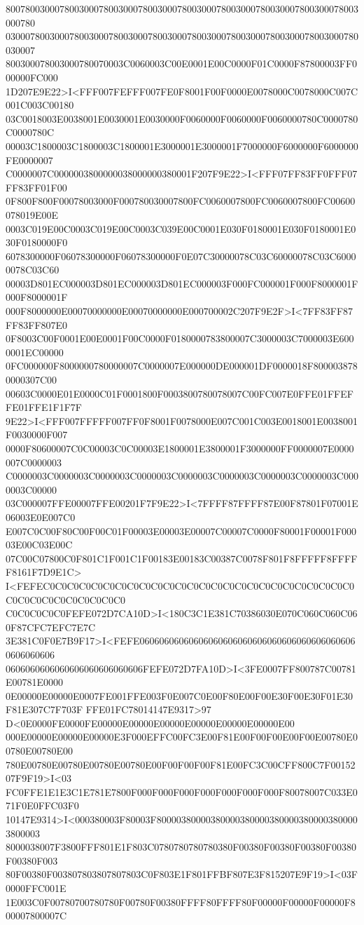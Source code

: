 800780030007800300078003000780030007800300078003000780030007800300078003000780
030007800300078003000780030007800300078003000780030007800300078003000780030007
800300078003000780070003C0060003C00E0001E00C0000F01C0000F87800003FF000000FC000
1D207E9E22>I<FFF007FEFFF007FE0F8001F00F0000E0078000C0078000C007C001C003C00180
03C0018003E0038001E0030001E0030000F0060000F0060000F0060000780C0000780C0000780C
00003C1800003C1800003C1800001E3000001E3000001F7000000F6000000F6000000FE0000007
C0000007C0000003800000038000000380001F207F9E22>I<FFF07FF83FF0FFF07FF83FF01F00
0F800F800F00078003000F000780030007800FC0060007800FC0060007800FC00600078019E00E
0003C019E00C0003C019E00C0003C039E00C0001E030F0180001E030F0180001E030F0180000F0
6078300000F06078300000F06078300000F0E07C30000078C03C60000078C03C60000078C03C60
00003D801EC000003D801EC000003D801EC000003F000FC000001F000F8000001F000F8000001F
000F8000000E00070000000E00070000000E000700002C207F9E2F>I<7FF83FF87FF83FF807E0
0F8003C00F0001E00E0001F00C0000F0180000783800007C3000003C7000003E6000001EC00000
0FC000000F8000000780000007C0000007E000000DE000001DF0000018F8000038780000307C00
00603C0000E01E0000C01F0001800F0003800780078007C00FC007E0FFE01FFEFFE01FFE1F1F7F
9E22>I<FFF007FFFFF007FF0F8001F0078000E007C001C003E0018001E0038001F0030000F007
0000F80600007C0C00003C0C00003E1800001E3800001F3000000FF0000007E0000007C0000003
C0000003C0000003C0000003C0000003C0000003C0000003C0000003C0000003C0000003C00000
03C000007FFE00007FFE00201F7F9E22>I<7FFFF87FFFF87E00F87801F07001E06003E0E007C0
E007C0C00F80C00F00C01F00003E00003E00007C00007C0000F80001F00001F00003E00C03E00C
07C00C07800C0F801C1F001C1F00183E00183C00387C0078F801F8FFFFF8FFFFF8161F7D9E1C>
I<FEFEC0C0C0C0C0C0C0C0C0C0C0C0C0C0C0C0C0C0C0C0C0C0C0C0C0C0C0C0C0C0C0C0C0C0C0C0
C0C0C0C0C0FEFE072D7CA10D>I<180C3C1E381C70386030E070C060C060C060F87CFC7EFC7E7C
3E381C0F0E7B9F17>I<FEFE060606060606060606060606060606060606060606060606060606
0606060606060606060606060606FEFE072D7FA10D>I<3FE0007FF800787C00781E00781E0000
0E00000E00000E0007FE001FFE003F0E007C0E00F80E00F00E30F00E30F01E30F81E307C7F703F
FFE01FC78014147E9317>97 D<0E0000FE0000FE00000E00000E00000E00000E00000E00000E00
000E00000E00000E00000E3F000EFFC00FC3E00F81E00F00F00E00F00E00780E00780E00780E00
780E00780E00780E00780E00780E00F00F00F00F81E00FC3C00CFF800C7F0015207F9F19>I<03
FC0FFE1E1E3C1E781E7800F000F000F000F000F000F000F000F80078007C033E071F0E0FFC03F0
10147E9314>I<000380003F80003F800003800003800003800003800003800003800003800003
8000038007F3800FFF801E1F803C0780780780780380F00380F00380F00380F00380F00380F003
80F00380F003807803807807803C0F803E1F801FFBF807E3F815207E9F19>I<03F0000FFC001E
1E003C0F00780700780780F00780F00380FFFF80FFFF80F00000F00000F00000F800007800007C
